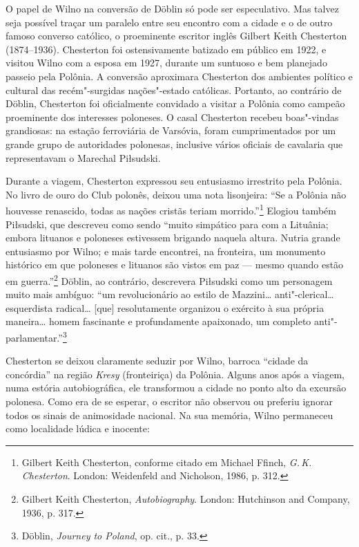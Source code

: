 %

O papel de Wilno na conversão de Döblin só pode ser especulativo. Mas
talvez seja possível traçar um paralelo entre seu encontro com a cidade
e o de outro famoso converso católico, o proeminente escritor inglês
Gilbert Keith Chesterton (1874--1936). Chesterton foi ostensivamente
batizado em público em 1922, e visitou Wilno com a esposa em 1927,
durante um suntuoso e bem planejado passeio pela Polônia. A conversão
aproximara Chesterton dos ambientes político e cultural das
recém"-surgidas nações"-estado católicas. Portanto, ao contrário de
Döblin, Chesterton foi oficialmente convidado a visitar a Polônia como
campeão proeminente dos interesses poloneses. O casal Chesterton recebeu
boas"-vindas grandiosas: na estação ferroviária de Varsóvia, foram
cumprimentados por um grande grupo de autoridades polonesas, inclusive
vários oficiais de cavalaria que representavam o Marechal Piłsudski.

Durante a viagem, Chesterton expressou seu entusiasmo irrestrito pela
Polônia. No livro de ouro do  Club polonês, deixou uma nota
lisonjeira: ``Se a Polônia não houvesse renascido, todas as nações
cristãs teriam morrido.''\footnote{Gilbert Keith Chesterton, conforme
  citado em Michael Ffinch, \emph{G.\,K. Chesterton}. London: Weidenfeld
  and Nicholson, 1986, p. 312.} Elogiou também Piłsudski, que descreveu
como sendo ``muito simpático para com a Lituânia; embora lituanos e
poloneses estivessem brigando naquela altura. Nutria grande entusiasmo
por Wilno; e mais tarde encontrei, na fronteira, um monumento histórico
em que poloneses e lituanos são vistos em paz --- mesmo quando estão em
guerra.''\footnote{Gilbert Keith Chesterton, \emph{Autobiography}.
  London: Hutchinson and Company, 1936, p. 317.} Döblin, ao contrário,
descrevera Piłsudski como um personagem muito mais ambíguo: ``um
revolucionário ao estilo de Mazzini\ldots{} anti"-clerical\ldots{}
esquerdista radical\ldots{} {[}que{]} resolutamente organizou o exército
à sua própria maneira\ldots{} homem fascinante e profundamente
apaixonado, um completo anti"-parlamentar.''\footnote{Döblin,
  \emph{Journey to Poland}, op. cit., p. 33.}

Chesterton se deixou claramente seduzir por Wilno, barroca ``cidade da
concórdia'' na região \emph{Kresy} (fronteiriça) da Polônia. Alguns anos
após a viagem, numa estória autobiográfica, ele transformou a cidade no
ponto alto da excursão polonesa. Como era de se esperar, o escritor não
observou ou preferiu ignorar todos os sinais de animosidade nacional. Na
sua memória, Wilno permaneceu como localidade lúdica e inocente:

